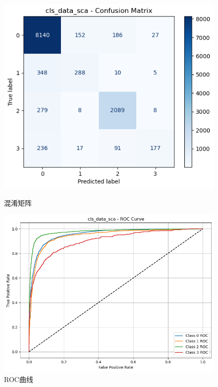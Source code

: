 \documentclass[10pt]{article}
\begin{document}
\begin{figure}[H]
\centering
\begin{minipage}[t]{0.45\textwidth}
  \centering
  \includegraphics[width=\linewidth]{cls_log_sca1.png}
  \caption{混淆矩阵}
  \label{fig:33}
\end{minipage}
\hfill
\begin{minipage}[t]{0.52\textwidth}
  \centering
  \includegraphics[width=\linewidth]{cls_log_sca2.png}
  \caption{ROC曲线}
  \label{fig:34}
\end{minipage}
\end{figure}
\end{document}
